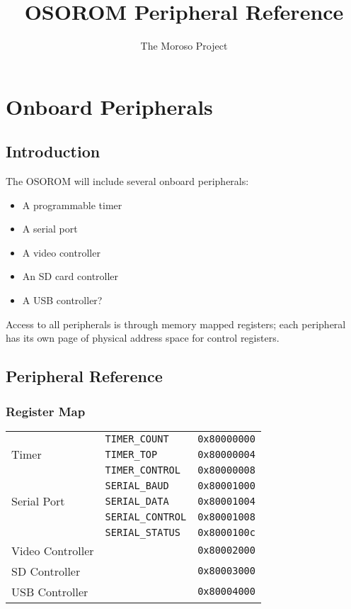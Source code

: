 \documentclass[11pt,openany]{report}
\title{OSOROM Peripheral Reference}
\author{The Moroso Project}
\begin{document}
\maketitle
\tableofcontents

\chapter{Onboard Peripherals}

\section{Introduction}
The OSOROM will include several onboard peripherals:
\begin{itemize}
\item A programmable timer
\item A serial port
\item A video controller
\item An SD card controller
\item A USB controller?
\end{itemize}

Access to all peripherals is through memory mapped registers; each
peripheral has its own page of physical address space for control
registers.

\section{Peripheral Reference}
\subsection{Register Map}

\begin{center}
  \begin{tabular}{|l|l|l|}
    \hline
    \multirow{3}{*}{Timer} & \verb|TIMER_COUNT| & \texttt{0x80000000} \\
                           & \verb|TIMER_TOP| & \texttt{0x80000004} \\
                           & \verb|TIMER_CONTROL| & \texttt{0x80000008} \\
    \hline
    \multirow{3}{*}{Serial Port} & \verb|SERIAL_BAUD| & \texttt{0x80001000} \\
                           & \verb|SERIAL_DATA| & \texttt{0x80001004} \\
                           & \verb|SERIAL_CONTROL| & \texttt{0x80001008} \\
                           & \verb|SERIAL_STATUS| & \texttt{0x8000100c} \\
    \hline
    Video Controller & & \texttt{0x80002000} \\
    \hline
    SD Controller & & \texttt{0x80003000} \\
    \hline
    USB Controller & & \texttt{0x80004000} \\
    \hline
  \end{tabular}
\end{center}
\end{document}
